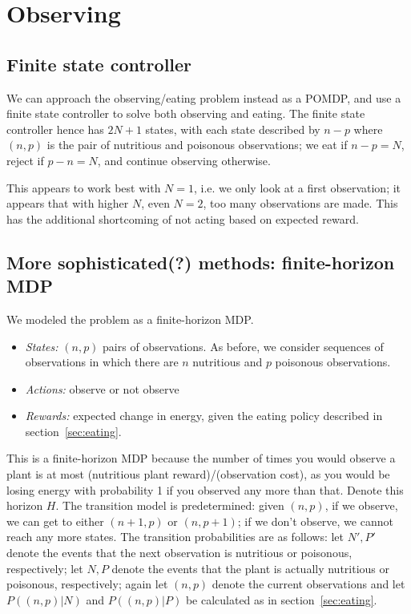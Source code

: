 \documentclass{article}
\begin{document}

\section{Observing}
\subsection{Finite state controller}
We can approach the observing/eating problem instead as a POMDP, and
use a finite state controller to solve both observing and eating.  The
finite state controller hence has $2N+1$ states, with each state
described by $n-p$ where $(n,p)$ is the pair of nutritious and
poisonous observations; we eat if $n-p=N$, reject if $p-n=N$, and
continue observing otherwise.

This appears to work best with $N=1$, i.e. we only look at a first
observation; it appears that with higher $N$, even $N=2$, too many
observations are made. This has the additional shortcoming of not
acting based on expected reward.



\subsection{More sophisticated(?) methods: finite-horizon MDP}
We modeled the problem as a finite-horizon MDP.
\begin{itemize}
\item \emph{States:} $(n,p)$ pairs of observations. As before, we consider
  sequences of observations in which there are $n$ nutritious and $p$
  poisonous observations. 
\item \emph{Actions:} observe or not observe
\item \emph{Rewards:} expected change in energy, given the eating policy
  described in section~\ref{sec:eating}. 
\end{itemize}
This is a finite-horizon MDP because the number of times you would
observe a plant is at most (nutritious plant reward)/(observation cost),
as you would be losing energy with probability 1 if you observed any more
than that. Denote this horizon $H$.
The transition model is predetermined: given $(n,p)$, if we observe,
we can get to either $(n+1,p)$ or $(n,p+1)$; if we don't observe, we
cannot reach any more states. 
The transition probabilities are as follows:
let $N',P'$ denote the events that the next observation is nutritious or poisonous,
respectively; let $N,P$ denote the events that the plant is actually nutritious
or poisonous, respectively; again let $(n,p)$ denote the current observations
and let $P((n,p)|N)$ and $P((n,p)|P)$ be calculated as in section~\ref{sec:eating}.
\end{document}
